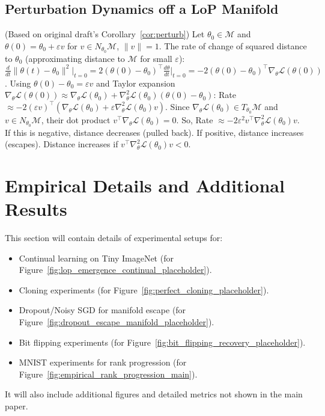 \documentclass{article}
\newcommand{\Loss}{\mathcal{L}}
\begin{document}
\subsection{Perturbation Dynamics off a LoP Manifold}
(Based on original draft's Corollary~\ref{cor:perturb})
Let $\theta_0 \in \mathcal{M}$ and $\theta(0) = \theta_0 + \varepsilon v$ for $v \in N_{\theta_0}\mathcal{M}$, $\|v\|=1$.
The rate of change of squared distance to $\theta_0$ (approximating distance to $\mathcal{M}$ for small $\varepsilon$):
$\frac{d}{dt} \|\theta(t) - \theta_0\|^2 \Big|_{t=0} = 2 (\theta(0)-\theta_0)^\top \frac{d\theta}{dt}\Big|_{t=0} = -2 (\theta(0)-\theta_0)^\top \nabla_\theta \Loss(\theta(0))$.
Using $\theta(0)-\theta_0 = \varepsilon v$ and Taylor expansion $\nabla_\theta \Loss(\theta(0)) \approx \nabla_\theta \Loss(\theta_0) + \nabla_\theta^2 \Loss(\theta_0) (\theta(0)-\theta_0)$:
Rate $\approx -2 (\varepsilon v)^\top (\nabla_\theta \Loss(\theta_0) + \varepsilon \nabla_\theta^2 \Loss(\theta_0) v)$.
Since $\nabla_\theta \Loss(\theta_0) \in T_{\theta_0}\mathcal{M}$ and $v \in N_{\theta_0}\mathcal{M}$, their dot product $v^\top \nabla_\theta \Loss(\theta_0) = 0$.
So, Rate $\approx -2 \varepsilon^2 v^\top \nabla_\theta^2 \Loss(\theta_0) v$.
If this is negative, distance decreases (pulled back). If positive, distance increases (escapes). Distance increases if $v^\top\nabla_\theta^2\Loss(\theta_0)v < 0$.

\section{Empirical Details and Additional Results}
\label{app:empirical_details} %

This section will contain details of experimental setups for:
\begin{itemize}
    \item Continual learning on Tiny ImageNet (for Figure~\ref{fig:lop_emergence_continual_placeholder}).
    \item Cloning experiments (for Figure~\ref{fig:perfect_cloning_placeholder}).
    \item Dropout/Noisy SGD for manifold escape (for Figure~\ref{fig:dropout_escape_manifold_placeholder}).
    \item Bit flipping experiments (for Figure~\ref{fig:bit_flipping_recovery_placeholder}).
    \item MNIST experiments for rank progression (for Figure~\ref{fig:empirical_rank_progression_main}).
\end{itemize}
It will also include additional figures and detailed metrics not shown in the main paper.
\end{document}
